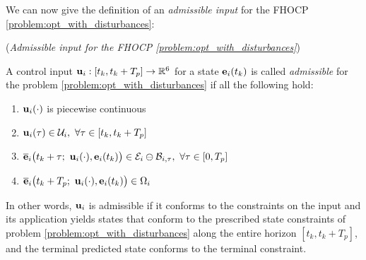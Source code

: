 We can now give the definition of an \textit{admissible input} for the FHOCP
\eqref{problem:opt_with_disturbances}:

\begin{bw_box}
  \begin{definition} (\textit{Admissible input for the FHOCP
    \eqref{problem:opt_with_disturbances}})
  \label{definition:admissible_input_with_disturbance}

  A control input $\bm{\mathbf{u}}_i : [t_k, t_k + T_p] \to \mathbb{R}^6$ for a state
  $\bm{\mathbf{e}}_i(t_k)$ is called \textit{admissible} for the problem
  \eqref{problem:opt_with_disturbances} if all the following hold:

  \begin{enumerate}
    \item $\bm{\mathbf{u}}_i(\cdot)$ is piecewise continuous
    \item $\vect{u}_i(\tau) \in \mathcal{U}_i,\ \forall \tau \in [t_k, t_k + T_p]$
    \item $\overline{\vect{e}}_i\big(t_k + \tau;\ \vect{u}_i(\cdot), \vect{e}_i(t_k)\big) \in \mathcal{E}_i \ominus \mathcal{B}_{i,\tau},\ \forall \tau \in [0, T_p]$
    \item $\overline{\vect{e}}_i\big(t_k + T_p;\ \vect{u}_i(\cdot), \vect{e}_i(t_k)\big) \in \Omega_i$
  \end{enumerate}

  In other words, $\bm{\mathbf{u}}_i$ is admissible if it conforms to the constraints
  on the input and its application yields states that conform to the
  prescribed state constraints of problem \eqref{problem:opt_with_disturbances}
  along the entire horizon $[t_k, t_k + T_p]$, and the terminal predicted
  state conforms to the terminal constraint.

\end{definition}
\end{bw_box}
